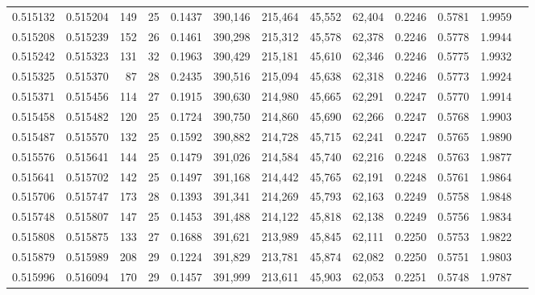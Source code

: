 \begin{tabular}{rrrrrrrrrrrrr}
0.515132 & 0.515204 & 149 &  25 &                                     0.1437 & 390,146 & 215,464 &  45,552 &  62,404 & 0.2246 & 0.5781 & 1.9959 \\
0.515208 & 0.515239 & 152 &  26 &                                     0.1461 & 390,298 & 215,312 &  45,578 &  62,378 & 0.2246 & 0.5778 & 1.9944 \\
0.515242 & 0.515323 & 131 &  32 &                                     0.1963 & 390,429 & 215,181 &  45,610 &  62,346 & 0.2246 & 0.5775 & 1.9932 \\
0.515325 & 0.515370 &  87 &  28 &                                     0.2435 & 390,516 & 215,094 &  45,638 &  62,318 & 0.2246 & 0.5773 & 1.9924 \\
0.515371 & 0.515456 & 114 &  27 &                                     0.1915 & 390,630 & 214,980 &  45,665 &  62,291 & 0.2247 & 0.5770 & 1.9914 \\
0.515458 & 0.515482 & 120 &  25 &                                     0.1724 & 390,750 & 214,860 &  45,690 &  62,266 & 0.2247 & 0.5768 & 1.9903 \\
0.515487 & 0.515570 & 132 &  25 &                                     0.1592 & 390,882 & 214,728 &  45,715 &  62,241 & 0.2247 & 0.5765 & 1.9890 \\
0.515576 & 0.515641 & 144 &  25 &                                     0.1479 & 391,026 & 214,584 &  45,740 &  62,216 & 0.2248 & 0.5763 & 1.9877 \\
0.515641 & 0.515702 & 142 &  25 &                                     0.1497 & 391,168 & 214,442 &  45,765 &  62,191 & 0.2248 & 0.5761 & 1.9864 \\
0.515706 & 0.515747 & 173 &  28 &                                     0.1393 & 391,341 & 214,269 &  45,793 &  62,163 & 0.2249 & 0.5758 & 1.9848 \\
0.515748 & 0.515807 & 147 &  25 &                                     0.1453 & 391,488 & 214,122 &  45,818 &  62,138 & 0.2249 & 0.5756 & 1.9834 \\
0.515808 & 0.515875 & 133 &  27 &                                     0.1688 & 391,621 & 213,989 &  45,845 &  62,111 & 0.2250 & 0.5753 & 1.9822 \\
0.515879 & 0.515989 & 208 &  29 &                                     0.1224 & 391,829 & 213,781 &  45,874 &  62,082 & 0.2250 & 0.5751 & 1.9803 \\
0.515996 & 0.516094 & 170 &  29 &                                     0.1457 & 391,999 & 213,611 &  45,903 &  62,053 & 0.2251 & 0.5748 & 1.9787 \\

\end{tabular}
